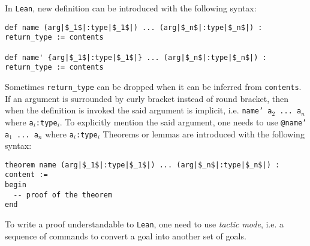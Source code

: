 \documentclass{report}
\theoremstyle{definition}
\theoremstyle{plain}
\begin{document}
In {\tt Lean}, new definition can be introduced with the following syntax:
\begin{verbatim}
def name (arg|$_1$|:type|$_1$|) ... (arg|$_n$|:type|$_n$|) : return_type := contents

def name' {arg|$_1$|:type|$_1$|} ... (arg|$_n$|:type|$_n$|) : return_type := contents
\end{verbatim}
Sometimes {\tt return\_type} can be dropped when it can be inferred from {\tt contents}. If an argument is surrounded by curly bracket instead of round bracket, then when the definition is invoked the said argument is implicit, i.e. {\tt name' a$_2$ ... a$_n$} where {\tt a$_i$:type$_i$}. To explicitly mention the said argument, one needs to use {\tt @name' a$_1$ ... a$_n$} where {\tt a$_i$:type$_i$}
Theorems or lemmas are introduced with the following syntax:
\begin{verbatim}
theorem name (arg|$_1$|:type|$_1$|) ... (arg|$_n$|:type|$_n$|) : content :=
begin
  -- proof of the theorem
end
\end{verbatim}

To write a proof understandable to {\tt Lean}, one need to use {\it tactic mode}, i.e. a sequence of commands to convert a goal into another set of goals. 

\end{document}
